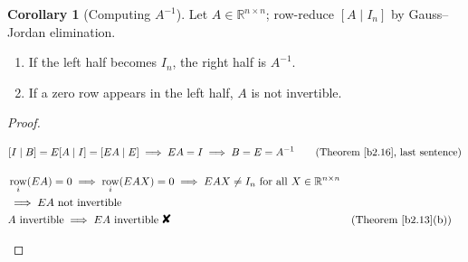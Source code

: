 \documentclass[12pt]{article}
\newcommand{\R}{\mathbb R}
\newcommand{\contradiction}{\mathord{\text{\large\ding{56}}}}
\DeclareMathOperator{\col}{col}
\theoremstyle{definition}
\newtheorem{corollary}[theorem]{Corollary}
\newcommand{\boardtop}{\vspace*{-\abovedisplayskip}}
\DeclareMathOperator{\row}{row}
\begin{document}
\begin{corollary}[Computing \(A^{-1}\)]\label{b2.17}
Let \(A\in\R^{n\times n}\); row-reduce \([A\mid I_n]\) by Gauss--Jordan elimination.
\begin{enumerate}
\item If the left half becomes \(I_n\), the right half is \(A^{-1}\).
\item If a zero row appears in the left half, \(A\) is not invertible.
\end{enumerate}
\end{corollary}
\begin{proof}
\begin{board}[(a) \(E\): the product of the elementary matrices used (Theorem~\ref{b2.15}(c)); \(\col_j(EM)=E\col_j(M)\)
(\lec{1}, \lit{Theorem~4}(a)):]
\[
[I\mid B]=E[A\mid I]=[EA\mid E]\implies EA=I\implies B=E=A^{-1}\qquad\text{(Theorem~\ref{b2.16}, last sentence)}
\]
\end{board}
\begin{board}[(b) The left half is \(EA\), \(E\) invertible (Theorem~\ref{b2.15}(c)); \(\row_i(EAX)=\row_i(EA)X\)
(\lec{1}, \lit{Theorem~4}(c)):]
\boardtop
\begin{align*}
&\row_i(EA)=0\implies\row_i(EAX)=0\implies EAX\ne I_n\ \text{for all }X\in\R^{n\times n}\\
&\implies EA\text{ not invertible}\\
&A\text{ invertible}\implies EA\text{ invertible}\ \contradiction&&\text{(Theorem~\ref{b2.13}(b))}
\end{align*}
\end{board}
\nopagebreak
\end{proof}
\end{document}
